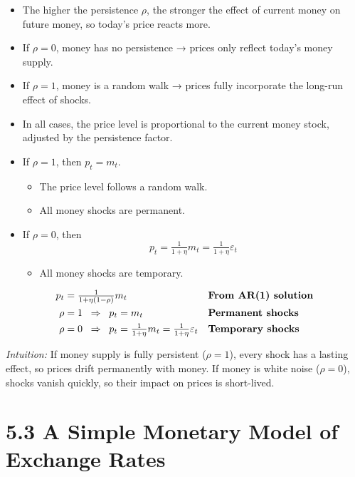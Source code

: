 \documentclass[12pt]{article}
\begin{document}
\begin{itemize}
    \item The higher the persistence \(\rho\), the stronger the effect of current money on future money, so today’s price reacts more.  
    \item If \(\rho=0\), money has no persistence → prices only reflect today’s money supply.  
    \item If \(\rho=1\), money is a random walk → prices fully incorporate the long-run effect of shocks.  
    \item In all cases, the price level is proportional to the current money stock, adjusted by the persistence factor.  
\end{itemize}

\begin{itemize}
    \item If $\rho = 1$, then $p_t = m_t$. 
    \begin{itemize}
        \item The price level follows a random walk.  
        \item All money shocks are permanent.  
    \end{itemize}
    \item If $\rho = 0$, then 
    \[
        p_t = \tfrac{1}{1+\eta} m_t = \tfrac{1}{1+\eta}\varepsilon_t
    \] 
    \begin{itemize}
        \item All money shocks are temporary.  
    \end{itemize}
\end{itemize}


\singlespacing
\begin{align}
p_t &= \tfrac{1}{1+\eta(1-\rho)} m_t && \text{\textbf{From AR(1) solution}} \\
\rho &= 1 \;\;\Rightarrow\;\; p_t = m_t && \text{\textbf{Permanent shocks}} \\
\rho &= 0 \;\;\Rightarrow\;\; p_t = \tfrac{1}{1+\eta} m_t 
     = \tfrac{1}{1+\eta}\varepsilon_t && \text{\textbf{Temporary shocks}}
\end{align}

\textit{Intuition:}  
If money supply is fully persistent ($\rho=1$), every shock has a lasting effect, so prices drift permanently with money.  
If money is white noise ($\rho=0$), shocks vanish quickly, so their impact on prices is short-lived.

\section*{\noindent\textbf{5.3 A Simple Monetary Model of Exchange Rates}}
\end{document}
